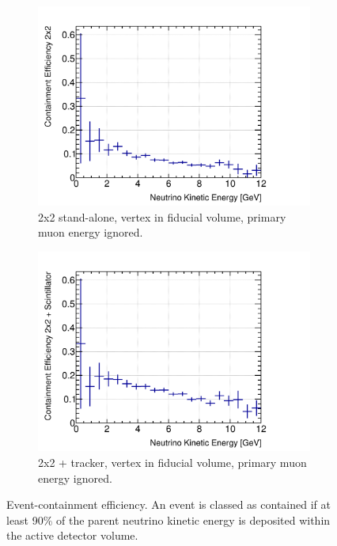 \documentclass[10pt,a4paper,openany]{article}
\begin{document}
\begin{figure}[!htb]
	\centering
	\begin{subfigure}[b]{0.49\textwidth}
		\centering
    \includegraphics[width=1.0\textwidth]{E_cont_eff_2x2_fiducial_gap_no_prim_muon.png}
		\caption{2x2 stand-alone, vertex in fiducial volume, primary muon energy ignored.}
		\label{}
	\end{subfigure}	
	\hfill
	\begin{subfigure}[b]{0.49\textwidth}
		\centering
		\includegraphics[width=1.0\textwidth]{E_cont_eff_2x2_Scintillator_fiducial_gap_no_prim_muon.png}
		\caption{2x2 + tracker, vertex in fiducial volume, primary muon energy ignored.}
		\label{}
	\end{subfigure}	
  \caption{Event-containment efficiency. An event is classed as contained if at least 90\% of the parent neutrino kinetic energy is deposited within the active detector volume.}
\end{figure}
\end{document}

